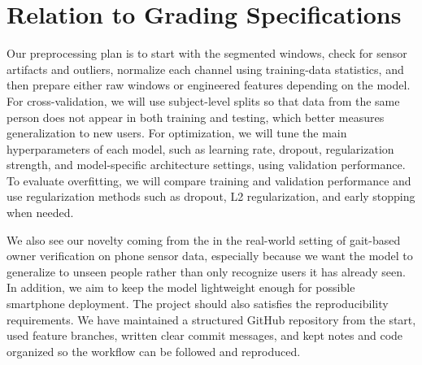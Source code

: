 \section{Relation to Grading Specifications}


Our preprocessing plan is to start with the segmented windows, check for sensor artifacts and outliers, normalize each channel using training-data statistics, and then prepare either raw windows or engineered features depending on the model. For cross-validation, we will use subject-level splits so that data from the same person does not appear in both training and testing, which better measures generalization to new users. For optimization, we will tune the main hyperparameters of each model, such as learning rate, dropout, regularization strength, and model-specific architecture settings, using validation performance. To evaluate overfitting, we will compare training and validation performance and use regularization methods such as dropout, L2 regularization, and early stopping when needed. 

\newpage
We also see our novelty coming from the in the real-world setting of gait-based owner verification on phone sensor data, especially because we want the model to generalize to unseen people rather than only recognize users it has already seen. In addition, we aim to keep the model lightweight enough for possible smartphone deployment. The project should also satisfies the reproducibility requirements. We have maintained a structured GitHub repository from the start, used feature branches, written clear commit messages, and kept notes and code organized so the workflow can be followed and reproduced.